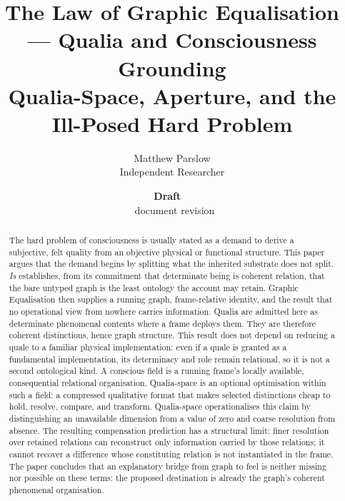 \documentclass[11pt,a4paper]{article}
\title{The Law of Graphic Equalisation --- Qualia and Consciousness Grounding\\\large Qualia-Space, Aperture, and the Ill-Posed Hard Problem}
\author{Matthew Parslow\\Independent Researcher}
\date{\textbf{Draft \texorpdfstring{\textemdash}{---}\ \PaperDraft}\\[2pt]\PaperDisplayDate \texorpdfstring{\textbullet}{\textperiodcentered}\ document revision \PaperRevision}
\theoremstyle{remark}\newtheorem{remark}[definition]{Remark}
\begin{document}
\maketitle
\begin{center}
\end{center}
\vspace{1em}

\begin{abstract}
The hard problem of consciousness is usually stated as a demand to derive a
subjective, felt quality from an objective physical or functional structure. This
paper argues that the demand begins by splitting what the inherited substrate does
not split. \emph{Is} establishes, from its commitment that determinate being is
coherent relation, that the bare untyped graph is the least ontology the account
may retain. Graphic Equalisation then supplies a running graph, frame-relative
identity, and the result that no operational view from nowhere carries information.
Qualia are admitted here as determinate phenomenal contents where a frame deploys
them. They are therefore coherent distinctions, hence graph structure. This result
does not depend on reducing a quale to a familiar physical implementation: even if
a quale is granted as a fundamental implementation, its determinacy and role remain
relational, so it is not a second ontological kind. A conscious field is a running
frame's locally available, consequential relational organisation. Qualia-space is
an optional optimisation within such a field: a compressed qualitative format that
makes selected distinctions cheap to hold, resolve, compare, and transform.
Qualia-space operationalises this claim by distinguishing an unavailable dimension
from a value of zero and coarse resolution from absence. The resulting compensation prediction has a
structural limit: finer resolution over retained relations can reconstruct only
information carried by those relations; it cannot recover a difference whose
constituting relation is not instantiated in the frame. The paper concludes that
an explanatory bridge from graph to feel is neither missing nor possible on these
terms: the proposed destination is already the graph's coherent phenomenal
organisation.
\end{abstract}
\end{document}
